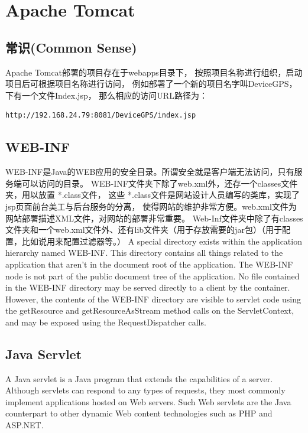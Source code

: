 \documentclass{book}
\begin{document}
\section{Apache Tomcat}

\subsection{常识(Common Sense)}

Apache Tomcat部署的项目存在于webapps目录下，
按照项目名称进行组织，启动项目后可根据项目名称进行访问，
例如部署了一个新的项目名字叫DeviceGPS，下有一个文件Index.jsp，
那么相应的访问URL路径为：


\begin{lstlisting}[language=HTML]
http://192.168.24.79:8081/DeviceGPS/index.jsp
\end{lstlisting}

\subsection{WEB-INF}

WEB-INF是Java的WEB应用的安全目录。所谓安全就是客户端无法访问，只有服务端可以访问的目录。
WEB-INF文件夹下除了web.xml外，还存一个classes文件夹，用以放置 *.class文件，
这些 *.class文件是网站设计人员编写的类库，实现了jsp页面前台美工与后台服务的分离，
使得网站的维护非常方便。web.xml文件为网站部署描述XML文件，对网站的部署非常重要。
Web-Inf文件夹中除了有classes文件夹和一个web.xml文件外、还有lib文件夹（用于存放需要的jar包）（用于配置，比如说用来配置过滤器等。）
A special directory exists within the application hierarchy named  WEB-INF. 
This directory contains all things related to the application that aren’t 
in the document root of the application. The  WEB-INF node is not part of 
the public document tree of the application. 
No file contained in the WEB-INF directory may be served directly to a client by the container. 
However, the contents of the WEB-INF directory are visible to servlet code using the getResource 
and getResourceAsStream method calls on the ServletContext, and may be exposed using 
the RequestDispatcher calls.

\subsection{Java Servlet}

A Java servlet is a Java program that extends the capabilities of a server. 
Although servlets can respond to any types of requests, 
they most commonly implement applications hosted on Web servers. 
Such Web servlets are the Java counterpart to other dynamic Web content technologies such as PHP and ASP.NET.
\end{document}
